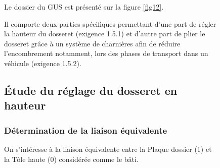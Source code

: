 \begin{figure}[ht!]
\begin{minipage}{0.55\linewidth}
Le dossier du GUS est présenté sur la figure \ref{fig12}.

Il comporte deux parties spécifiques permettant d'une part de régler la hauteur du dosseret (exigence 1.5.1) et d'autre part de plier le dosseret grâce à un système de charnières afin de réduire l'encombrement notamment, lors des phases de transport dans un véhicule (exigence 1.5.2).

\subsection{Étude du réglage du dosseret en hauteur}

\subsubsection{Détermination de la liaison équivalente}

On s'intéresse à la liaison équivalente entre la Plaque dossier (1) et la Tôle haute (0) considérée comme le bâti.


\end{minipage}
\end{figure}

